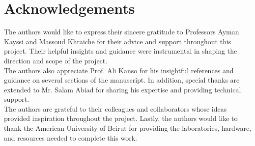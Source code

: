 \chapter*{Acknowledgements}

\noindent The authors would like to express their sincere gratitude to Professors Ayman Kayssi and Massoud Khraiche for their advice and support throughout this project.  Their helpful insights and guidance were instrumental in shaping the direction and scope of the project.\\

\noindent The authors also appreciate Prof. Ali Kanso for his insightful references and guidance on several sections of the manuscript. In addition, special thanks are extended to Mr. Salam Abiad for sharing his expertise and providing technical support.\\

\noindent The authors are grateful to their colleagues and collaborators whose ideas provided inspiration throughout the project. Lastly, the authors would like to thank the American University of Beirut for providing the laboratories, hardware, and resources needed to complete this work.

\hspace{1.5cm}







 


